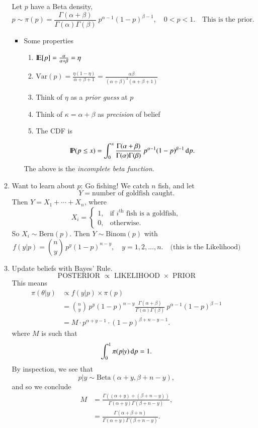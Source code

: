 \documentclass[captions=tableheading]{scrbook}
\begin{document}
\begin{itemize}
\begin{enumerate}
\begin{center}
   \end{center}
   Let $p$ have a Beta density,
   \begin{equation}
   p \sim \pi(p)=\frac{\Gamma(\alpha+\beta)}{\Gamma(\alpha)\Gamma(\beta)}\: p^{\alpha-1}(1-p)^{\beta-1},\quad 0 < p < 1. \quad \mbox {This is the prior.}
   \end{equation}
\begin{itemize}
\item Some properties
\begin{enumerate}
\item \(\mathrm{I\hspace{-1.5pt}E}[p] = \frac{\alpha}{\alpha+\beta}=\eta  \)
\item \(\mbox{Var}(p) = \frac{\eta(1 - \eta)}{\alpha + \beta + 1} = \frac{\alpha\beta}{(\alpha + \beta)^{2}(\alpha + \beta + 1)}   \)
\item Think of $\eta$ as a \emph{prior guess} at $p$
\item Think of \(\kappa = \alpha + \beta\) as \emph{precision} of belief
\item The CDF is
\end{enumerate}
\[
      \mathrm{I\hspace{-1.5pt}P}(p \leq x) = \int_{0}^{x}\frac{\Gamma(\alpha+\beta)}{\Gamma(\alpha)\Gamma(\beta)}\: p^{\alpha-1}(1-p)^{\beta-1}\,\mathrm{d} p.
      \]
      The above is the \emph{incomplete beta function}.
\end{itemize}
\item Want to learn about $p$:  Go fishing! We catch $n$ fish, and let
   \[
   Y = \mbox{number of goldfish caught.} 
   \]
   Then \( Y = X_{1}+\cdots+X_{n} \), where 
   \[
   X_{i}=
   \begin{cases}
   1, & \mbox{if $i^{\mathrm{th}}$ fish is a goldfish},\\
   0, & \mbox{otherwise}.
   \end{cases}
   \]
   So \(X_{i} \sim \mathrm{Bern}(p)\).  Then \(Y \sim \mathrm{Binom}(p)\) with
   \[
   f(y|p) = {n \choose y}\,p^{y}(1-p)^{n - y},\quad y = 1,2,\ldots,n. \quad \mbox{(this is the Likelihood)}
   \]
\item Update beliefs with Bayes' Rule.
   \[
   \mbox{POSTERIOR \(\propto\) LIKELIHOOD $\times$ PRIOR}
   \]
   This means
   \begin{align*}
   \pi(\theta|y)& \propto f(y|p) \times \pi(p)\\
   &= {n \choose y}\,p^{y}(1 - p)^{n - y}\frac{\Gamma(\alpha+\beta)}{\Gamma(\alpha)\Gamma(\beta)}\: p^{\alpha-1}(1-p)^{\beta-1}\\
   &= M \cdot p^{\alpha + y - 1}\cdot (1 - p)^{\beta + n - y - 1}.
   \end{align*}
   where $M$ is such that
   \[
   \int_{0}^{1}\pi(p|y)\,\mathrm{d} p = 1.
   \]
   By inspection, we see that
   \[
   p|y \sim \mathrm{Beta}(\alpha + y,\beta + n- y),
   \]
   and so we conclude
   \begin{align*}
   M &= \frac{\Gamma((\alpha + y)+(\beta+n-y))}{\Gamma(\alpha+y)\Gamma(\beta+n-y)},\\
   &= \frac{\Gamma(\alpha+\beta+n)}{\Gamma(\alpha+y)\Gamma(\beta+n-y)}.
   \end{align*}


\end{enumerate}
\end{itemize}
\end{document}
